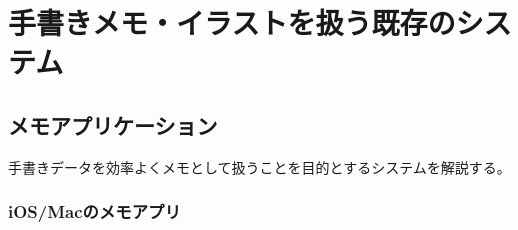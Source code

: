 \section{手書きメモ・イラストを扱う既存のシステム}

%
%
%

\subsection{メモアプリケーション}
手書きデータを効率よくメモとして扱うことを目的とするシステムを解説する。

\subsubsection{iOS/Macのメモアプリ}

